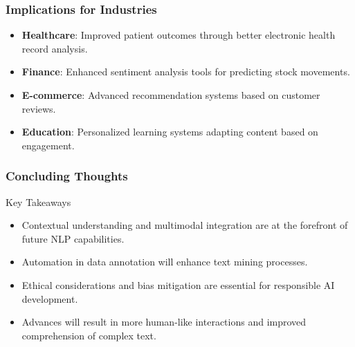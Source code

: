 \documentclass[aspectratio=169]{beamer}
\begin{document}
\begin{frame}[fragile]
    \frametitle{Implications for Industries}
    \begin{itemize}
        \item \textbf{Healthcare}: Improved patient outcomes through better electronic health record analysis.
        \item \textbf{Finance}: Enhanced sentiment analysis tools for predicting stock movements.
        \item \textbf{E-commerce}: Advanced recommendation systems based on customer reviews.
        \item \textbf{Education}: Personalized learning systems adapting content based on engagement.
    \end{itemize}
\end{frame}

\begin{frame}[fragile]
    \frametitle{Concluding Thoughts}
    \begin{block}{Key Takeaways}
        \begin{itemize}
            \item Contextual understanding and multimodal integration are at the forefront of future NLP capabilities.
            \item Automation in data annotation will enhance text mining processes.
            \item Ethical considerations and bias mitigation are essential for responsible AI development.
            \item Advances will result in more human-like interactions and improved comprehension of complex text.
        \end{itemize}
    \end{block}
\end{frame}
\end{document}
